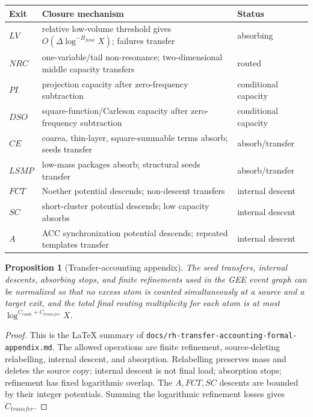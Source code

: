 \documentclass[11pt]{article}
\newtheorem{proposition}[theorem]{Proposition}
\theoremstyle{definition}
\begin{document}
\begin{longtable}{@{}L{0.12\textwidth}L{0.62\textwidth}L{0.18\textwidth}@{}}
\toprule
Exit & Closure mechanism & Status\\
\midrule
$LV$ & relative low-volume threshold gives $O(\Delta\log^{-B_{final}}X)$; failures transfer & absorbing\\
$NRC$ & one-variable/tail non-resonance; two-dimensional middle capacity transfers & routed\\
$PI$ & projection capacity after zero-frequency subtraction & conditional capacity\\
$DSO$ & square-function/Carleson capacity after zero-frequency subtraction & conditional capacity\\
$CE$ & coarea, thin-layer, square-summable terms absorb; seeds transfer & absorb/transfer\\
$LSMP$ & low-mass packages absorb; structural seeds transfer & absorb/transfer\\
$FCT$ & Noether potential descends; non-descent transfers & internal descent\\
$SC$ & short-cluster potential descends; low capacity absorbs & internal descent\\
$A$ & ACC synchronization potential descends; repeated templates transfer & internal descent\\
\bottomrule
\end{longtable}


\begin{proposition}[Transfer-accounting appendix]
The seed transfers, internal descents, absorbing stops, and finite refinements used in the GEE event graph can be normalized so that no excess atom is counted simultaneously at a source and a target exit, and the total final routing multiplicity for each atom is at most $\log^{C_{route}+C_{transfer}}X$.
\end{proposition}
\begin{proof}
This is the LaTeX summary of \texttt{docs/rh-transfer-accounting-formal-appendix.md}.  The allowed operations are finite refinement, source-deleting relabelling, internal descent, and absorption.  Relabelling preserves mass and deletes the source copy; internal descent is not final load; absorption stops; refinement has fixed logarithmic overlap.  The $A,FCT,SC$ descents are bounded by their integer potentials.  Summing the logarithmic refinement losses gives $C_{transfer}$.
\end{proof}
\end{document}
